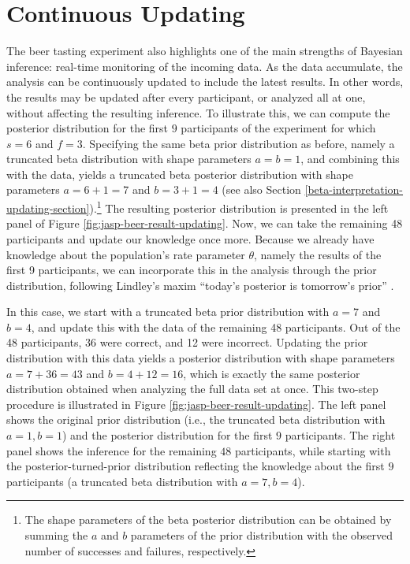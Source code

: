 \documentclass[
]{book}
\begin{document}
\hypertarget{continuous-updating}{%
\section{Continuous Updating}\label{continuous-updating}}

The beer tasting experiment also highlights one of the main strengths of Bayesian inference: real-time monitoring of the incoming data. As the data accumulate, the analysis can be continuously updated to include the latest results. In other words, the results may be updated after every participant, or analyzed all at one, without affecting the resulting inference. To illustrate this, we can compute the posterior distribution for the first \(9\) participants of the experiment for which \(s = 6\) and \(f = 3\). Specifying the same beta prior distribution as before, namely a truncated beta distribution with shape parameters \(a = b = 1\), and combining this with the data, yields a truncated beta posterior distribution with shape parameters \(a = 6 + 1 = 7\) and \(b = 3 + 1 = 4\) (see also Section \ref{beta-interpretation-updating-section}).\footnote{ 
The shape parameters of the beta posterior distribution can be obtained by summing the $a$ and $b$ parameters of the prior distribution with the observed number of successes and failures, respectively.} The resulting posterior distribution is presented in the left panel of Figure \ref{fig:jasp-beer-result-updating}. Now, we can take the remaining 48 participants and update our knowledge once more. Because we already have knowledge about the population's rate parameter \(\theta\), namely the results of the first 9 participants, we can incorporate this in the analysis through the prior distribution, following Lindley's maxim ``today's posterior is tomorrow's prior'' \citep{Lindley1972}.

In this case, we start with a truncated beta prior distribution with \(a = 7\) and \(b = 4\), and update this with the data of the remaining 48 participants. Out of the 48 participants, 36 were correct, and 12 were incorrect. Updating the prior distribution with this data yields a posterior distribution with shape parameters \(a = 7 + 36 = 43\) and \(b = 4 + 12 = 16\), which is exactly the same posterior distribution obtained when analyzing the full data set at once. This two-step procedure is illustrated in Figure \ref{fig:jasp-beer-result-updating}. The left panel shows the original prior distribution (i.e., the truncated beta distribution with \(a = 1, b = 1\)) and the posterior distribution for the first \(9\) participants. The right panel shows the inference for the remaining \(48\) participants, while starting with the posterior-turned-prior distribution reflecting the knowledge about the first \(9\) participants (a truncated beta distribution with \(a = 7, b = 4\)).
\end{document}
